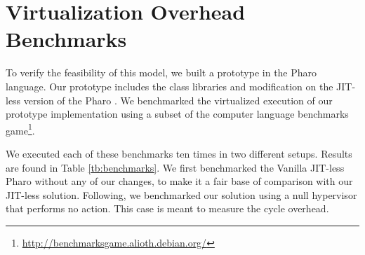 \section{Virtualization Overhead Benchmarks} \label{sec:virtualization_benchmarks}

To verify the feasibility of this model, we built a \Vtt prototype in the Pharo language. Our prototype includes the \Vtt class libraries and modification on the JIT-less version of the Pharo \VM.
We benchmarked the virtualized execution of our prototype implementation using a subset of the computer language benchmarks game\footnote{\url{http://benchmarksgame.alioth.debian.org/}}.

We executed each of these benchmarks ten times in two different setups. Results are found in Table \ref{tb:benchmarks}. We first benchmarked the Vanilla JIT-less Pharo \VM without any of our changes, to make it a fair base of comparison with our JIT-less solution. Following, we benchmarked our solution using a null hypervisor that performs no action. This case is meant to measure the cycle overhead.



